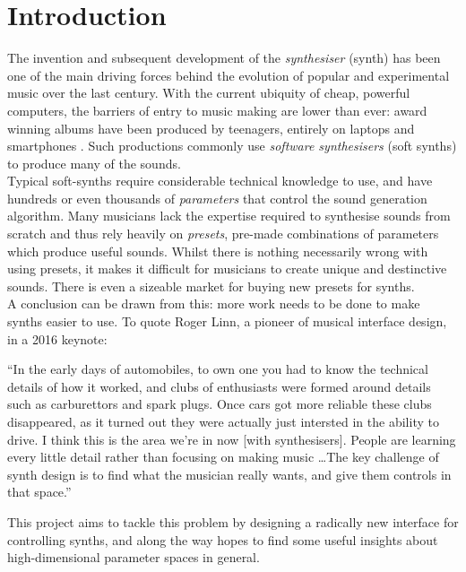 \documentclass[11pt, oneside]{report}   	%
\begin{document}
\chapter{Introduction}
The invention and subsequent development of the \emph{synthesiser} (synth) has been one of the main driving forces behind the evolution of popular and experimental music over the last century. With the current ubiquity of cheap, powerful computers, the barriers of entry to music making are lower than ever: award winning albums have been produced by teenagers, entirely on laptops and smartphones \cite{IphoneProducer}. Such productions commonly use \emph{software synthesisers} (soft synths) to produce many of the sounds.\\
Typical soft-synths require considerable technical knowledge to use, and have hundreds or even thousands of \emph{parameters} that control the sound generation algorithm. Many musicians lack the expertise required to synthesise sounds from scratch and thus rely heavily on \emph{presets}, pre-made combinations of parameters which produce useful sounds. Whilst there is nothing necessarily wrong with using presets, it makes it difficult for musicians to create unique and destinctive sounds. There is even a sizeable market for buying new presets for synths.\\
A conclusion can be drawn from this: more work needs to be done to make synths easier to use. To quote Roger Linn, a pioneer of musical interface design, in a 2016 keynote: \cite{LinnKeynote}
\begin{displayquote}
	\singlespacing
	``In the early days of automobiles, to own one you had to know the technical details of how it worked, and clubs of enthusiasts were formed around details such as carburettors and spark plugs. Once cars got more reliable these clubs disappeared, as it turned out they were actually just intersted in the ability to drive. I think this is the area we're in now [with synthesisers]. People are learning every little detail rather than focusing on making music \dots The key challenge of synth design is to find what the musician really wants, and give them controls in that space.''
\end{displayquote}
This project aims to tackle this problem by designing a radically new interface for controlling synths, and along the way hopes to find some useful insights about high-dimensional parameter spaces in general.
%
\end{document}
